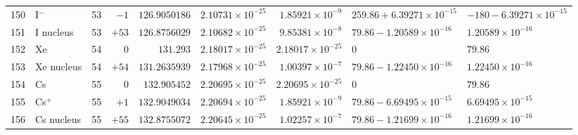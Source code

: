 {\begin{tabular}{@{}r l r r r r r l l@{}}
150 & I$^{-}$ & 53 & $-1$ & $126.9050186$ & $2.10731{\times}10^{-25}$ & $1.85921{\times}10^{-9}$ & $259.86 + 6.39271{\times}10^{-15}$ & $-180 - 6.39271{\times}10^{-15}$ \\
151 & I nucleus & 53 & $+53$ & $126.8756029$ & $2.10682{\times}10^{-25}$ & $9.85381{\times}10^{-8}$ & $79.86 - 1.20589{\times}10^{-16}$ & $1.20589{\times}10^{-16}$ \\
152 & Xe & 54 & $0$ & $131.293$ & $2.18017{\times}10^{-25}$ & $2.18017{\times}10^{-25}$ & $0$ & $79.86$ \\
153 & Xe nucleus & 54 & $+54$ & $131.2635939$ & $2.17968{\times}10^{-25}$ & $1.00397{\times}10^{-7}$ & $79.86 - 1.22450{\times}10^{-16}$ & $1.22450{\times}10^{-16}$ \\
154 & Cs & 55 & $0$ & $132.905452$ & $2.20695{\times}10^{-25}$ & $2.20695{\times}10^{-25}$ & $0$ & $79.86$ \\
155 & Cs$^{+}$ & 55 & $+1$ & $132.9049034$ & $2.20694{\times}10^{-25}$ & $1.85921{\times}10^{-9}$ & $79.86 - 6.69495{\times}10^{-15}$ & $6.69495{\times}10^{-15}$ \\
156 & Cs nucleus & 55 & $+55$ & $132.8755072$ & $2.20645{\times}10^{-25}$ & $1.02257{\times}10^{-7}$ & $79.86 - 1.21699{\times}10^{-16}$ & $1.21699{\times}10^{-16}$ \\
\bottomrule
\end{tabular}}
\endgroup
\clearpage
\begingroup\scriptsize\setlength{\extrarowheight}{0pt}\setlength{\tabcolsep}{3.2pt}\renewcommand{\arraystretch}{1.02}
